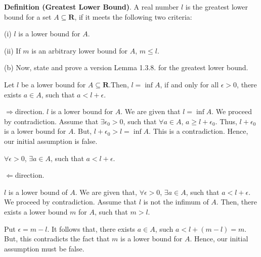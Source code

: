 \documentclass[10pt]{article}
\begin{document}
\textbf{Definition (Greatest Lower Bound)}. A real number $\displaystyle l$ is the greatest lower bound for a set $\displaystyle A\subseteq \mathbf{R}$, if it meets the following two criteria:



(i) $\displaystyle l$ is a lower bound for $\displaystyle A$.

(ii) If $\displaystyle m$ is an arbitrary lower bound for $\displaystyle A$, $\displaystyle m\leq l$.



(b) Now, state and prove a version Lemma 1.3.8. for the greatest lower bound.



Let $\displaystyle l$ be a lower bound for $\displaystyle A\subseteq \mathbf{R}$.Then, $\displaystyle l=\inf A$, if and only for all $\displaystyle \epsilon  >0$, there exists $\displaystyle a\in A$, such that $\displaystyle a< l+\epsilon $.



$\displaystyle \Longrightarrow $direction. $\displaystyle l$ is a lower bound for $\displaystyle A$. We are given that $\displaystyle l=\inf A$. We proceed by contradiction. Assume that $\displaystyle \exists \epsilon _{0}  >0$, such that $\displaystyle \forall a\in A$, $\displaystyle a\geq l+\epsilon _{0}$. Thus, $\displaystyle l+\epsilon _{0}$ is a lower bound for $\displaystyle A$. But, $\displaystyle l+\epsilon _{0}  >l=\inf A$. This is a contradiction. Hence, our initial assumption is false. 



$\displaystyle \forall \epsilon  >0$, $\displaystyle \exists a\in A$, such that $\displaystyle a< l+\epsilon $.



$\displaystyle \Longleftarrow $direction. 

$\displaystyle l$ is a lower bound of $\displaystyle A$. We are given that, $\displaystyle \forall \epsilon  >0$, $\displaystyle \exists a\in A$, such that $\displaystyle a< l+\epsilon $. We proceed by contradiction. Assume that $\displaystyle l$ is not the infimum of $\displaystyle A$. Then, there exists a lower bound $\displaystyle m$ for $\displaystyle A$, such that $\displaystyle m >l$. 



Put $\displaystyle \epsilon =m-l$. It follows that, there exists $\displaystyle a\in A$, such $\displaystyle a< l+( m-l) =m$. But, this contradicts the fact that $\displaystyle m$ is a lower bound for $\displaystyle A$. Hence, our initial assumption must be false. 
\end{document}
